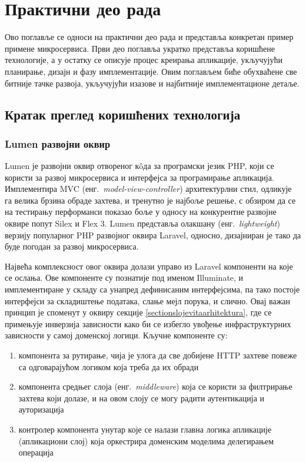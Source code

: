 \documentclass[12pt,oneside]{memoir}
\begin{document}
\chapter{Практични део рада}\label{prakticnideo}
Ово поглавље се односи на практични део рада и представља конкретан пример примене микросервиса. Први део поглавља укратко представља коришћене технологије, а у остатку се описује процес креирања апликације, укључујући планирање, дизајн и фазу имплементације. Овим поглављем биће обухваћене све битније тачке развоја, укључујући изазове и најбитније имплементационе детаље.
\section{Кратак преглед коришћених технологија}
\subsection{Lumen развојни оквир}
Lumen\cite{Lumen} је развојни оквир отвореног кôда за програмски језик PHP, који се користи за развој микросервиса и интерфејса за програмирање апликација. Имплементира MVC (енг.~\textit{model-view-controller}) архитектурлни стил, одликује га велика брзина обраде захтева, и тренутно је најбоље решење, с обзиром да се на тестирању перформанси показао боље у односу на конкурентне развојне оквире попут Silex и Flex 3. Lumen представља олакшану (енг.~\textit{lightweight}) верзију популарног PHP развојног оквира Laravel, односно, дизајниран је тако да буде погодан за развој микросервиса.

Највећа комплексност овог оквира долази управо из Laravel\cite{Laravel} компоненти на које се ослања. Ове компоненте су познатије под именом Illuminate, и имплементиране у складу са унапред дефинисаним интерфејсима, па тако постоје интерфејси за складиштење података, слање мејл порука, и слично. Овај важан принцип је споменут у оквиру секције \ref{sectionslojevitaarhitektura}, где се примењује инверзија зависности како би се избегло увођење инфраструктурних зависности у самој доменској логици. Кључне компоненте су:
\begin{enumerate}
\item компонента за рутирање, чија је улога да све добијене HTTP захтеве повеже са одговарајућом логиком која треба да их обради 
\item компонента средњег слоја (енг.~\textit{middleware}) која се користи за филтрирање захтева који долазе, и на овом слоју се могу радити аутентикација и ауторизација
\item контролер компонента унутар које се налази главна логика апликације (апликациони слој) која оркестрира доменским моделима делегирањем операција
\end{enumerate}
\end{document}
